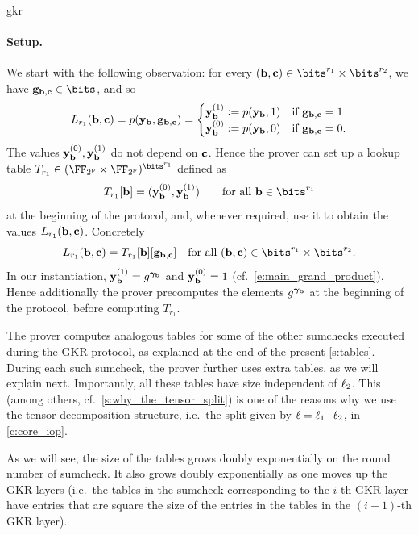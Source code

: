 \begin{lncsappendix}{gkr}
\paragraph{Setup.} We start with the following observation: for every $(\bb,\cc)\in \bits^{r_1} \times \bits^{r_2}$, we have $\bfg_{\bb,\cc}\in \bits$, and so 
%
$$L_{r_1}(\mathbf{b},\mathbf{c})=p(\mathbf{y}_{\mathbf{b}}, \mathbf{g}_{\mathbf{b},\mathbf{c}})= 
\begin{cases}
    \mathbf{y}_{\mathbf{b}}^{(1)}{\;\vcentcolon=\;} p(\mathbf{y}_{\mathbf{b}},1) & \text{if } \mathbf{g}_{\mathbf{b},\mathbf{c}}=1\\
     \mathbf{y}_{\mathbf{b}}^{(0)}{\;\vcentcolon=\;} p(\mathbf{y}_{\mathbf{b}},0) & \text{if } \mathbf{g}_{\mathbf{b},\mathbf{c}}=0.
\end{cases}$$
%
The values $\mathbf{y}_{\mathbf{b}}^{(0)}, \mathbf{y}_{\mathbf{b}}^{(1)}$   do not depend on $\mathbf{c}$. Hence the prover can set up a lookup table $T_{r_1}\in (\comfield\times \comfield)^{\bits^{r_1}}$ defined as
%
$$
T_{r_1}[\bb]= (\yy_{\bb}^{(0)}, \yy_{\bb}^{(1)}) \qquad \text{for all } \bb \in \bits^{r_1}
$$
at the beginning of the protocol, and, whenever required, use it to obtain the values $L_{r_1}(\mathbf{b},\mathbf{c})$. Concretely
%
$$
L_{r_1}(\bb,\cc)=T_{r_1}[\bb][\bfg_{\bb,\cc}] \quad \text{for all } (\bb,\cc)\in \bits^{r_1}\times \bits^{r_2}.
$$
In our instantiation, $\mathbf{y}_{\mathbf{b}}^{(1)}=g^{\bm{\gamma}_{\mathbf{b}}}$ and $\mathbf{y}_{\mathbf{b}}^{(0)}=1$ (cf.\ \eqref{e:main_grand_product}). Hence additionally the prover precomputes the elements $g^{\bm{\gamma}_{\mathbf{b}}}$ at the beginning of the protocol, before computing $T_{r_1}$. 

The prover computes analogous tables for some of the other sumchecks executed during the GKR protocol, as explained at the end of the present \cref{s:tables}.  During each such sumcheck, the prover further uses extra tables, as we will explain next. Importantly, all these tables have size independent of $\ell_2$.  This (among others, cf.\ \cref{s:why_the_tensor_split}) is one of the reasons why we use the tensor decomposition structure, i.e.\ the split given by $\ell=\ell_1\cdot \ell_2$, in \cref{c:core_iop}.

As we will see, the size of the tables grows doubly exponentially on the round number of sumcheck. It also grows doubly exponentially as one moves up the GKR layers (i.e.\ the tables in the sumcheck corresponding to the $i$-th GKR layer have entries that are square the size of the entries in the tables in the $(i+1)$-th GKR  layer). 








\end{lncsappendix}
